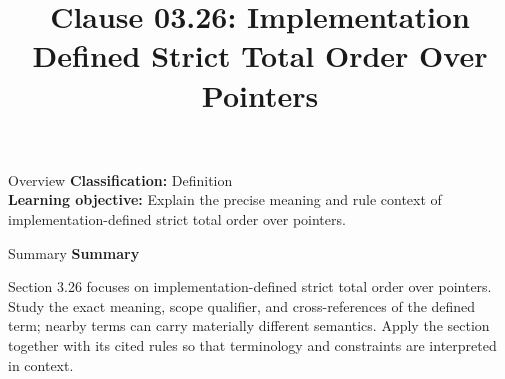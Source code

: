 \documentclass[10pt,letterpaper]{article}
\title{Clause 03.26: Implementation Defined Strict Total Order Over Pointers}
\author{}
\date{}
\begin{document}
\maketitle
\begin{CornellOverviewBox}{Overview}
\textbf{Classification:} Definition\\[2pt]
\textbf{Learning objective:} Explain the precise meaning and rule context of implementation-defined strict total order over pointers.
\end{CornellOverviewBox}\begin{CornellSummaryBox}{Summary}
{\sffamily\bfseries\color{Accent} Summary}\par\vspace{3pt}Section 3.26 focuses on implementation-defined strict total order over pointers. Study the exact meaning, scope qualifier, and cross-references of the defined term; nearby terms can carry materially different semantics. Apply the section together with its cited rules so that terminology and constraints are interpreted in context.
\end{CornellSummaryBox}
\end{document}

